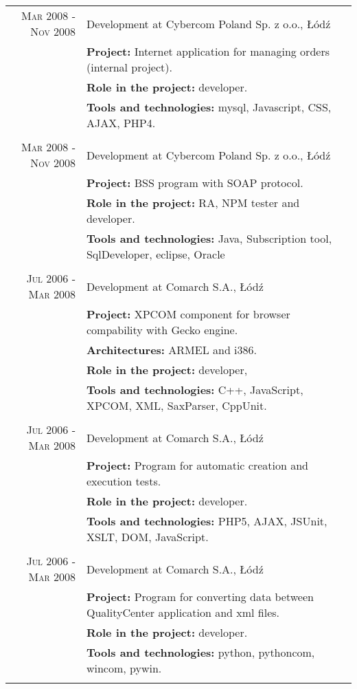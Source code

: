 \documentclass[a4paper,9pt]{article} %
\begin{document}
\begin{longtable}{r|p{11cm}}
\textsc{Mar 2008 - Nov 2008} & Development at Cybercom Poland Sp. z o.o., Łódź\\
& \textbf{Project:} Internet application for managing orders (internal project).\\
& \textbf{Role in the project:} developer.\\
& \textbf{Tools and technologies:} mysql, Javascript, CSS, AJAX, PHP4.\\
\multicolumn{2}{c}{} \\

\textsc{Mar 2008 - Nov 2008} & Development at Cybercom Poland Sp. z o.o., Łódź\\
& \textbf{Project:} BSS program with SOAP protocol.\\
& \textbf{Role in the project:} RA, NPM tester and developer.\\
& \textbf{Tools and technologies:} Java, Subscription tool, SqlDeveloper, eclipse, Oracle\\
\multicolumn{2}{c}{} \\

\textsc{Jul 2006 - Mar 2008} & Development at Comarch S.A., Łódź\\
& \textbf{Project:} XPCOM component for browser compability with Gecko engine.\\
& \textbf{Architectures:} ARMEL and i386.\\
& \textbf{Role in the project:} developer, \\
& \textbf{Tools and technologies:} C++, JavaScript, XPCOM, XML, SaxParser, CppUnit.\\
\multicolumn{2}{c}{} \\

\textsc{Jul 2006 - Mar 2008} & Development at Comarch S.A., Łódź\\
& \textbf{Project:} Program for automatic creation and execution tests.\\
& \textbf{Role in the project:} developer.\\
& \textbf{Tools and technologies:} PHP5, AJAX, JSUnit, XSLT, DOM, JavaScript.\\
\multicolumn{2}{c}{} \\

\textsc{Jul 2006 - Mar 2008} & Development at Comarch S.A., Łódź\\
& \textbf{Project:} Program for converting data between QualityCenter application and xml files.\\
& \textbf{Role in the project:} developer.\\
& \textbf{Tools and technologies:} python, pythoncom, wincom, pywin.\\
\multicolumn{2}{c}{} \\


\end{longtable}
\end{document}
